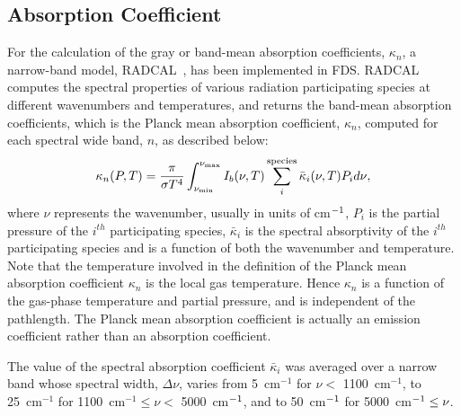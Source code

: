 \subsection{Absorption Coefficient}

For the calculation of the gray or band-mean absorption coefficients,
$\kappa_n$, a narrow-band model, RADCAL~\cite{RadCal}, has been
implemented in FDS. RADCAL computes the spectral properties of various 
radiation participating species at different wavenumbers and temperatures, 
and returns the band-mean absorption coefficients, which is the 
Planck mean absorption coefficient, $\kappa_n$, computed
for each spectral wide band, $n$, as described below:
\begin{equation}
\kappa_n(P,T) = \dfrac{\pi}{\sigma T^4}
\displaystyle\int_{\nu_{\rm min}}^{\nu_{\rm max}}{I_b(\nu,T)
\displaystyle\sum_{i}^{\rm species} \bar{\kappa}_i(\nu,T) P_i d\nu}, 
\end{equation}
where $\nu$ represents the wavenumber, usually in units of cm$^{\rm -1}$,
$P_i$ is the partial pressure of the $i^{th}$ participating species,
$\bar{\kappa}_i$ is the spectral absorptivity of the $i^{th}$ participating species 
and is a function of both the wavenumber and temperature.
Note that the temperature involved in the definition of the 
Planck mean absorption coefficient $\kappa_n$ is
the local gas temperature. Hence $\kappa_n$ is a function 
of the gas-phase temperature and partial pressure, 
and is independent of the pathlength.
The Planck mean absorption coefficient is actually an 
emission coefficient rather than an absorption coefficient.

The value of the spectral absorption coefficient $\bar{\kappa}_i$
was averaged over a narrow band whose spectral width, $\Delta \nu$, varies from
5~cm$^{-1}$ for $\nu < $ 1100~cm$^{-1}$, to
25~cm$^{-1}$ for 1100~cm$^{-1} \leq \nu < $ 5000~cm$^{\rm -1}$,
and to 50~cm$^{\rm -1}$ for 5000~cm$^{\rm -1}\leq \nu$.


